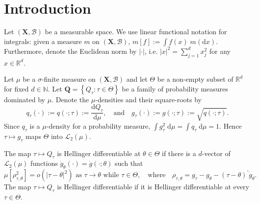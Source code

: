 
\section{Introduction}
\label{sec--intro}

Let \((\mathbf{X}, \mathcal{B})\) be a measurable space.
We use linear functional notation for integrals: given a measure \(m\) on
\((\mathbf{X}, \mathcal{B})\), \(m [f] := \int f (x) \; m (\mathrm{d} x)\).
Furthermore, denote the Euclidean norm by \(|\cdot|\), i.e.
\(|x|^{2} = \sum_{j = 1}^{d} x_{j}^{2}\) for any \(x \in \mathbb{R}^{d}\).

Let \(\mu\) be a \(\sigma\)-finite measure on \((\mathbf{X}, \mathcal{B})\) and
let \(\Theta\) be a non-empty subset of \(\mathbb{R}^{d}\) for fixed \(d \in
\mathbb{N}\).
Let \(\mathbf{Q} = \left\{ Q_{\tau} : \tau \in \Theta \right\}\) be a family
of probability measures dominated by \(\mu\).
Denote the \(\mu\)-densities and their square-roots by
\begin{equation}
  q_{\tau} (\cdot) := q (\cdot; \tau) := \frac{\mathrm{d}
  Q_{\tau}}{\mathrm{d} \mu}, \quad \text{and} \quad g_{\tau} (\cdot) := g
  (\cdot; \tau) := \sqrt{q (\cdot; \tau)}.
  \label{eqn--q-density-and-sqrt}
\end{equation}
Since \(q_{\tau}\) is a \(\mu\)-density for a probability measure, \(\int
g_{\tau}^{2} \; \mathrm{d} \mu = \int q_{\tau} \; \mathrm{d} \mu = 1\).
Hence \(\tau \mapsto g_{\tau}\) maps \(\Theta\) into \(\mathscr{L}_{2} (\mu)\).

\begin{definition}
\label{def--hellinger-diff}
The map \(\tau \mapsto Q_{\tau}\) is Hellinger differentiable at \(\theta \in
\Theta\) if there is a \(d\)-vector of \(\mathscr{L}_{2} (\mu)\) functions
\(\dot{g}_{\theta} (\cdot) = \dot{g} \left( \cdot; \theta \right)\) such that
\begin{equation}
  \mu \left[ \rho_{\tau, \theta}^{2} \right] = o \left( \left| \tau -
  \theta \right|^{2} \right) \text{ as } \tau \to \theta \text{ while }
  \tau \in \Theta, \quad \text{where} \quad
  \rho_{\tau, \theta} = g_{\tau} - g_{\theta} - \left(
  \tau - \theta \right)^{\prime} \dot{g}_{\theta}.
  \label{eqn--hellinger-diff-def-remainder}
\end{equation}
The map \(\tau \mapsto Q_{\tau}\) is Hellinger differentiable if it is
Hellinger differentiable at every \(\tau \in \Theta\).
\end{definition}

